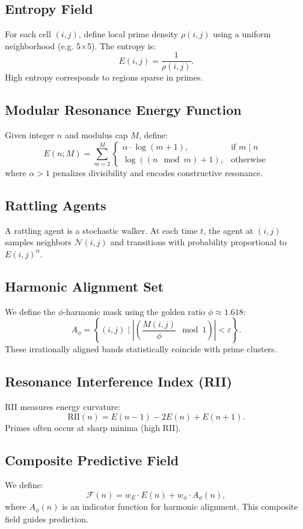 \documentclass[12pt]{article}
\begin{document}
\subsection{Entropy Field}
For each cell \((i,j)\), define local prime density \(\rho(i,j)\) using a uniform neighborhood (e.g. 5×5). The entropy is:
\[
E(i,j) = \frac{1}{\rho(i,j)}.
\]
High entropy corresponds to regions sparse in primes.

\subsection{Modular Resonance Energy Function}
Given integer \(n\) and modulus cap \(M\), define:
\[
E(n;M) = \sum_{m=2}^{M}
\begin{cases}
\alpha \cdot \log(m+1), & \text{if } m \mid n \\
\log((n \mod m) + 1), & \text{otherwise}
\end{cases}
\]
where \(\alpha > 1\) penalizes divisibility and encodes constructive resonance.

\subsection{Rattling Agents}
A rattling agent is a stochastic walker. At each time \(t\), the agent at \((i,j)\) samples neighbors \(\mathcal{N}(i,j)\) and transitions with probability proportional to \(E(i,j)^\alpha\).

\subsection{Harmonic Alignment Set}
We define the \(\phi\)-harmonic mask using the golden ratio \(\phi \approx 1.618\):
\[
A_\phi = \left\{ (i,j) \mid \left| \left( \frac{M(i,j)}{\phi} \mod 1 \right) \right| < \varepsilon \right\}.
\]
These irrationally aligned bands statistically coincide with prime clusters.

\subsection{Resonance Interference Index (RII)}
RII measures energy curvature:
\[
\text{RII}(n) = E(n-1) - 2E(n) + E(n+1).
\]
Primes often occur at sharp minima (high RII).

\subsection{Composite Predictive Field}
We define:
\[
\mathcal{F}(n) = w_E \cdot E(n) + w_\phi \cdot A_\phi(n),
\]
where \(A_\phi(n)\) is an indicator function for harmonic alignment. This composite field guides prediction.
\end{document}
